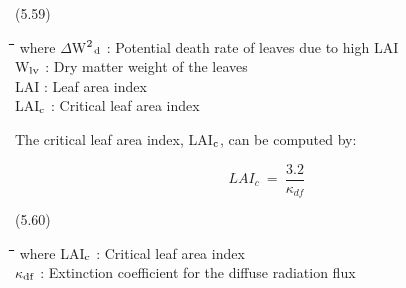 \documentclass[11pt]{article}
\begin{document}
 \bigskip
\strut\hfill (5.59)

\nwln
\begin{tabbing}
\hspace{1.27cm}\=\hspace{1.27cm}\=\hspace{1.27cm}\=\hspace{1.27cm}\=%
\hspace{1.27cm}\=\hspace{1.27cm}\=\hspace{1.27cm}\=\hspace{1.27cm}\=%
\hspace{1.27cm}\=\hspace{1.27cm}\=\kill
where\> $\Delta$W$^{{\rm 2}}$$_{{\rm d}}$\> : Potential death rate of leaves due to high LAI\> \> \> \> \> \> \> \> [kg ha$^{{\rm -1}}$ d$^{{\rm -1}}$]\\
\>W$_{{\rm lv}}$\> : Dry matter weight of the leaves\> \> \> \> \> \> \> \> [kg ha$^{{\rm -1}}$]\\
\>LAI\> : Leaf area index\> \> \> \> \> \> \> \> [ha ha$^{{\rm -1}}$]\\
\>LAI$_{{\rm c}}$\> : Critical leaf area index\> \> \> \> \> \> \> \> [ha ha$^{{\rm -1}}$]
\end{tabbing}

\bigskip
\bigskip
The critical leaf area index, LAI$_{{\rm c}}$,  can be computed by:

\begin{displaymath}
LAI _{c} ~=~{\frac{3.2}{\kappa  _{df} }}
\end{displaymath}

 \bigskip
\strut\hfill (5.60)

\nwln
\begin{tabbing}
\hspace{1.27cm}\=\hspace{1.27cm}\=\hspace{1.27cm}\=\hspace{1.27cm}\=%
\hspace{1.27cm}\=\hspace{1.27cm}\=\hspace{1.27cm}\=\hspace{1.27cm}\=%
\hspace{1.27cm}\=\hspace{1.27cm}\=\kill
where\> LAI$_{{\rm c}}$\> : Critical leaf area index\> \> \> \> \> \> \> \> [ha ha$^{{\rm -1}}$]\\
\>$\kappa$$_{{\rm df}}$\> : Extinction coefficient for the diffuse radiation flux\> \> \> \> \> \> \> \> [-]
\end{tabbing}
\end{document}

